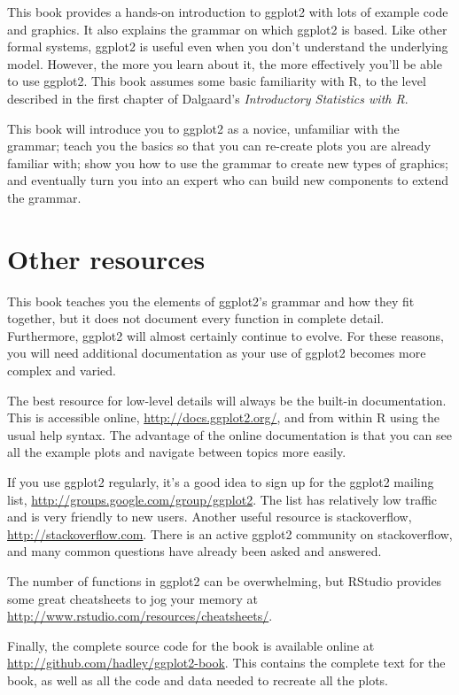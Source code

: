 This book provides a hands-on introduction to ggplot2 with lots of
example code and graphics. It also explains the grammar on which ggplot2
is based. Like other formal systems, ggplot2 is useful even when you
don't understand the underlying model. However, the more you learn about
it, the more effectively you'll be able to use ggplot2. This book
assumes some basic familiarity with R, to the level described in the
first chapter of Dalgaard's \emph{Introductory Statistics with R}.

This book will introduce you to ggplot2 as a novice, unfamiliar with the
grammar; teach you the basics so that you can re-create plots you are
already familiar with; show you how to use the grammar to create new
types of graphics; and eventually turn you into an expert who can build
new components to extend the grammar.

\section{Other resources}\label{sec:other-resources}

This book teaches you the elements of ggplot2's grammar and how they fit
together, but it does not document every function in complete detail.
Furthermore, ggplot2 will almost certainly continue to evolve. For these
reasons, you will need additional documentation as your use of ggplot2
becomes more complex and varied.

The best resource for low-level details will always be the built-in
documentation. This is accessible online,
\url{http://docs.ggplot2.org/}, and from within R using the usual help
syntax. The advantage of the online documentation is that you can see
all the example plots and navigate between topics more easily.

If you use ggplot2 regularly, it's a good idea to sign up for the
ggplot2 mailing list, \url{http://groups.google.com/group/ggplot2}. The
list has relatively low traffic and is very friendly to new users.
Another useful resource is stackoverflow,
\url{http://stackoverflow.com}. There is an active ggplot2 community on
stackoverflow, and many common questions have already been asked and
answered.

The number of functions in ggplot2 can be overwhelming, but RStudio
provides some great cheatsheets to jog your memory at
\url{http://www.rstudio.com/resources/cheatsheets/}.

Finally, the complete source code for the book is available online at
\url{http://github.com/hadley/ggplot2-book}. This contains the complete
text for the book, as well as all the code and data needed to recreate
all the plots.

